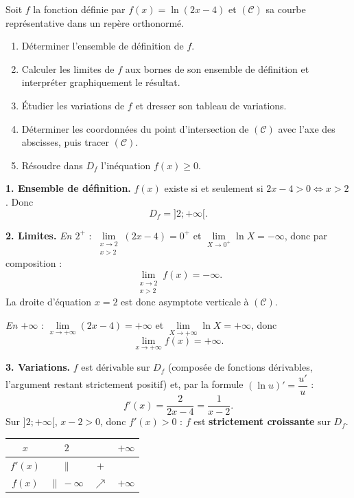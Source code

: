 \documentclass[11pt]{article}
\newcommand{\cle}[1]{{\popxbold\color{popdark}#1}}
\begin{document}
\begin{exoresolu}[Étude de $f(x)=\ln(2x-4)$ (type Bac A)]
Soit $f$ la fonction définie par $f(x)=\ln(2x-4)$ et $(\mathcal{C})$ sa courbe représentative dans un repère orthonormé.
\begin{enumerate}
\item Déterminer l'ensemble de définition de $f$.
\item Calculer les limites de $f$ aux bornes de son ensemble de définition et interpréter graphiquement le résultat.
\item Étudier les variations de $f$ et dresser son tableau de variations.
\item Déterminer les coordonnées du point d'intersection de $(\mathcal{C})$ avec l'axe des abscisses, puis tracer $(\mathcal{C})$.
\item Résoudre dans $D_f$ l'inéquation $f(x)\geq 0$.
\end{enumerate}
\tcblower
\textbf{1. Ensemble de définition.} $f(x)$ existe si et seulement si $2x-4>0 \iff x>2$. Donc
\[
D_f=]2;+\infty[.
\]

\textbf{2. Limites.}
\emph{En $2^+$} : $\lim\limits_{\substack{x\to 2\\x>2}}(2x-4)=0^+$ et $\lim\limits_{X\to 0^+}\ln X=-\infty$, donc par composition :
\[
\lim_{\substack{x\to 2\\x>2}} f(x)=-\infty.
\]
La droite d'équation $x=2$ est donc \cle{asymptote verticale} à $(\mathcal{C})$.

\emph{En $+\infty$} : $\lim\limits_{x\to+\infty}(2x-4)=+\infty$ et $\lim\limits_{X\to+\infty}\ln X=+\infty$, donc
\[
\lim_{x\to+\infty} f(x)=+\infty.
\]

\textbf{3. Variations.} $f$ est dérivable sur $D_f$ (composée de fonctions dérivables, l'argument restant strictement positif) et, par la formule $(\ln u)'=\dfrac{u'}{u}$ :
\[
f'(x)=\frac{2}{2x-4}=\frac{1}{x-2}.
\]
Sur $]2;+\infty[$, $x-2>0$, donc $f'(x)>0$ : $f$ est \textbf{strictement croissante} sur $D_f$.
\begin{center}
\begin{tabular}{|c|ccc|}
\hline
$x$ & $2$ & & $+\infty$ \\
\hline
$f'(x)$ & $\|$ & $+$ & \\
\hline
$f(x)$ & $\|\ -\infty$ & $\nearrow$ & $+\infty$ \\
\hline
\end{tabular}
\end{center}


\end{exoresolu}
\end{document}
